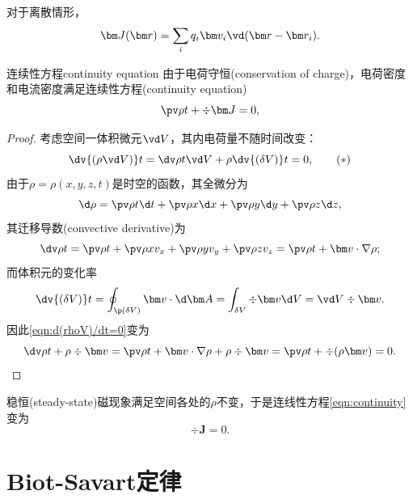 \begin{corollary}
    对于离散情形，
    \begin{equation}
        \bm J(\bm r)=\sum_i q_i\bm v_i\vd(\bm r-\bm r_i).
    \end{equation}
\end{corollary}

\begin{theorem}
    {连续性方程}{continuity equation}
    由于电荷守恒(conservation of charge)，电荷密度和电流密度满足连续性方程(continuity equation)
    \begin{equation}
        \label{eqn:continuity}
        \pv\rho t+\div\bm J=0,
    \end{equation}
\end{theorem}
\begin{proof}
    考虑空间一体积微元$\vd V$，其内电荷量不随时间改变：
    \begin{equation*}
        \label{eqn:d(rhoV)/dt=0}
        \dv{(\rho\vd V)}t=\dv\rho t\vd V+\rho\dv{(\delta V)}t=0,\tag{$\ast$}
    \end{equation*}
    由于$\rho=\rho(x,y,z,t)$是时空的函数，其全微分为
    \[
        \d\rho=\pv\rho t\d t+\pv\rho x\d x+\pv\rho y\d y+\pv\rho z\d z,
    \]
    其迁移导数(convective derivative)为
    \[
        \dv\rho t=\pv\rho t+\pv\rho xv_x+\pv\rho yv_y+\pv\rho zv_z=\pv\rho t+\bm v\cdot\nabla\rho;
    \]
    而体积元的变化率
    \[
        \dv{(\delta V)}t=\oint_{\p(\delta V)}\bm v\cdot\d\bm A=\int_{\delta V}\div\bm v\d V=\vd V\div\bm v.
    \]
    因此\eqref{eqn:d(rhoV)/dt=0}变为
    \[
        \dv\rho t+\rho\div\bm v=\pv\rho t+\bm v\cdot\nabla\rho+\rho\div\bm v=\pv\rho t+\div(\rho\bm v)=0.
        \qedhere
    \]
\end{proof}

\begin{corollary}
    稳恒(steady-state)磁现象满足空间各处的$\rho$不变，于是连线性方程\eqref{eqn:continuity}变为
    \begin{equation}
        \div\bm J=0.
    \end{equation}
\end{corollary}

\section{Biot-Savart定律}
\label{sec:Biot-Savart law}

